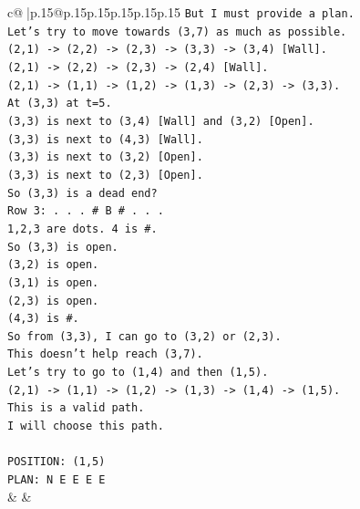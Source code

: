 \documentclass{article}
\begin{document}
{\begin{supertabular}{c@{$\;$}|p{.15\linewidth}@{}p{.15\linewidth}p{.15\linewidth}p{.15\linewidth}p{.15\linewidth}p{.15\linewidth}}
{{{\texttt{But I must provide a plan.} \\
\texttt{Let's try to move towards (3,7) as much as possible.} \\
\texttt{(2,1) {-}> (2,2) {-}> (2,3) {-}> (3,3) {-}> (3,4) {[}Wall{]}.} \\
\texttt{(2,1) {-}> (2,2) {-}> (2,3) {-}> (2,4) {[}Wall{]}.} \\
\texttt{(2,1) {-}> (1,1) {-}> (1,2) {-}> (1,3) {-}> (2,3) {-}> (3,3).} \\
\texttt{At (3,3) at t=5.} \\
\texttt{(3,3) is next to (3,4) {[}Wall{]} and (3,2) {[}Open{]}.} \\
\texttt{(3,3) is next to (4,3) {[}Wall{]}.} \\
\texttt{(3,3) is next to (3,2) {[}Open{]}.} \\
\texttt{(3,3) is next to (2,3) {[}Open{]}.} \\
\texttt{So (3,3) is a dead end?} \\
\texttt{Row 3: . . . \# B \# . . .} \\
\texttt{1,2,3 are dots. 4 is \#.} \\
\texttt{So (3,3) is open.} \\
\texttt{(3,2) is open.} \\
\texttt{(3,1) is open.} \\
\texttt{(2,3) is open.} \\
\texttt{(4,3) is \#.} \\
\texttt{So from (3,3), I can go to (3,2) or (2,3).} \\
\texttt{This doesn't help reach (3,7).} \\
\texttt{Let's try to go to (1,4) and then (1,5).} \\
\texttt{(2,1) {-}> (1,1) {-}> (1,2) {-}> (1,3) {-}> (1,4) {-}> (1,5).} \\
\texttt{This is a valid path.} \\
\texttt{I will choose this path.} \\
\\ 
\texttt{POSITION: (1,5)} \\
\texttt{PLAN: N E E E E} \\
            }
        }
    }
    & & \\ \\


\end{supertabular}}
\end{document}
